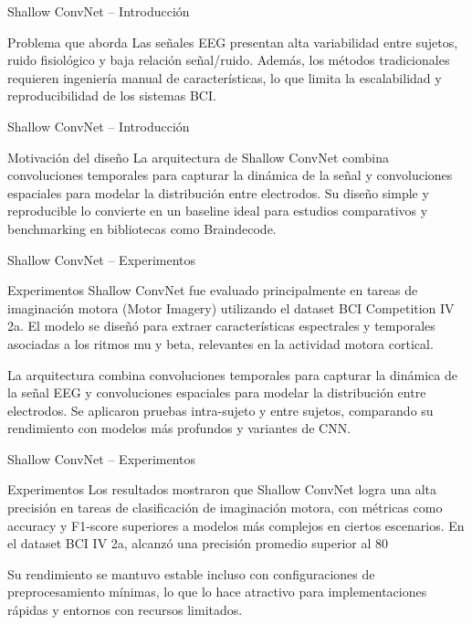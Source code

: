 \documentclass{beamer}
\begin{document}
\begin{frame}{Shallow ConvNet – Introducción}
\begin{block}{Problema que aborda}
Las señales EEG presentan alta variabilidad entre sujetos, ruido fisiológico y baja relación señal/ruido. Además, los métodos tradicionales requieren ingeniería manual de características, lo que limita la escalabilidad y reproducibilidad de los sistemas BCI.
\end{block}
\end{frame}

\begin{frame}{Shallow ConvNet – Introducción}
\begin{block}{Motivación del diseño}
La arquitectura de Shallow ConvNet combina convoluciones temporales para capturar la dinámica de la señal y convoluciones espaciales para modelar la distribución entre electrodos. Su diseño simple y reproducible lo convierte en un baseline ideal para estudios comparativos y benchmarking en bibliotecas como Braindecode.
\end{block}
\end{frame}


\begin{frame}{Shallow ConvNet – Experimentos}
\begin{block}{Experimentos}
Shallow ConvNet fue evaluado principalmente en tareas de imaginación motora (Motor Imagery) utilizando el dataset BCI Competition IV 2a. El modelo se diseñó para extraer características espectrales y temporales asociadas a los ritmos mu y beta, relevantes en la actividad motora cortical.

La arquitectura combina convoluciones temporales para capturar la dinámica de la señal EEG y convoluciones espaciales para modelar la distribución entre electrodos. Se aplicaron pruebas intra-sujeto y entre sujetos, comparando su rendimiento con modelos más profundos y variantes de CNN.
\end{block}
\end{frame}

\begin{frame}{Shallow ConvNet – Experimentos}
\begin{block}{Experimentos}
Los resultados mostraron que Shallow ConvNet logra una alta precisión en tareas de clasificación de imaginación motora, con métricas como accuracy y F1-score superiores a modelos más complejos en ciertos escenarios. En el dataset BCI IV 2a, alcanzó una precisión promedio superior al 80%

Su rendimiento se mantuvo estable incluso con configuraciones de preprocesamiento mínimas, lo que lo hace atractivo para implementaciones rápidas y entornos con recursos limitados.
\end{block}
\end{frame}
\end{document}
